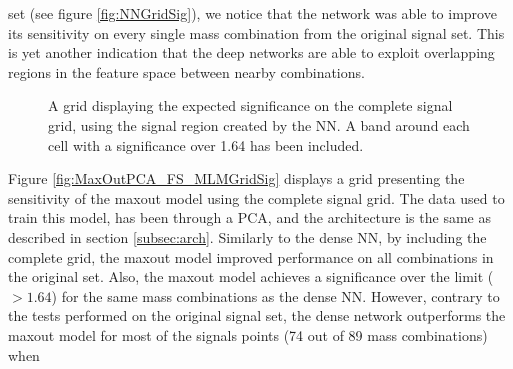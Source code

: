 set (see figure \ref{fig:NNGridSig}), we notice that the network was able to improve its sensitivity on every single mass combination from the original signal set. This is yet another 
indication that the deep networks are able to exploit overlapping regions in the feature space between nearby combinations.\\
\begin{figure}
    \caption{A grid displaying the expected significance on the complete signal grid, using the signal region 
    created by the \acs{NN}. A band around each cell with a significance over 1.64 has been included.}
    \label{fig:NN_FS_MLMGridSig}
\end{figure}
Figure \ref{fig:MaxOutPCA_FS_MLMGridSig} displays a grid presenting the sensitivity of the maxout model using the complete signal grid.
The data used to train this model, has been through a \ac{PCA}, and the architecture is the same as described in section \ref{subsec:arch}.
Similarly to the dense \ac{NN}, by including the complete grid, the maxout model improved performance on all combinations in the original set. 
Also, the maxout model achieves a significance over the limit ($>1.64$) for the same mass combinations as the dense \ac{NN}. However, contrary to the tests 
performed on the original signal set, the dense network outperforms the maxout model for most of the signals points (74 out of 89 mass combinations) when 
